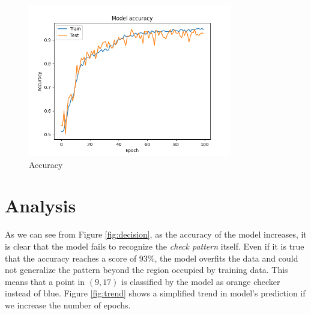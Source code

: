 \documentclass[compsoc]{IEEEtran}
\begin{document}
\begin{figure}[ht!]
\centering                                                                        
\includegraphics[width=3.5in]{../images/accuracy-4000-6-binary_crossentropy-adam-100-4.png}
\captionsetup{justification=centering}                                                                                                                                   
\caption{Accuracy}
\label{fig:acc}                                                                                                                                                           
\end{figure}



\section{Analysis}
As we can see from Figure \ref{fig:decision}, as the accuracy of the model increases, it is clear that the model fails to recognize the \emph{check pattern} itself. Even if it is true that the accuracy reaches a score of $93\%$, the model overfits the data and could not generalize the pattern beyond the region occupied by training data. 
This means that a point in $(9, 17)$ is classified by the model as orange checker instead of blue. Figure \ref{fig:trend} shows a simplified trend in model's prediction if we increase the number of epochs.
\end{document}
